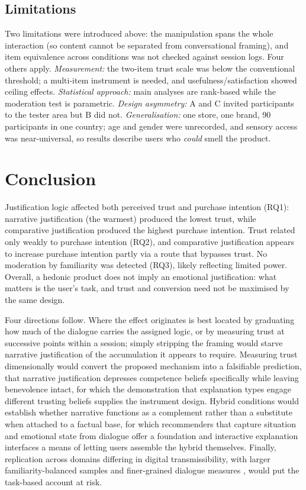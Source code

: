 \documentclass[conference]{IEEEtran}
\begin{document}
\subsection{Limitations}

Two limitations were introduced above: the manipulation spans the whole interaction (so
content cannot be separated from conversational framing), and item equivalence across
conditions was not checked against session logs. Four others apply.
\textit{Measurement:} the two-item trust scale was below the conventional threshold; a
multi-item instrument is needed, and usefulness/satisfaction showed ceiling effects.
\textit{Statistical approach:} main analyses are rank-based while the moderation test is
parametric. \textit{Design asymmetry:} A and C invited participants to the tester area but B
did not. \textit{Generalisation:} one store, one brand, 90 participants in one country; age
and gender were unrecorded, and sensory access was near-universal, so results describe users
who \textit{could} smell the product.

\section{Conclusion}
\label{sec:conclusion}

Justification logic affected both perceived trust and purchase intention (RQ1): narrative
justification (the warmest) produced the lowest trust, while comparative justification
produced the highest purchase intention. Trust related only weakly to purchase intention
(RQ2), and comparative justification appears to increase purchase intention partly via a
route that bypasses trust. No moderation by familiarity was detected (RQ3), likely reflecting
limited power. Overall, a hedonic product does not imply an emotional justification: what
matters is the user's task, and trust and conversion need not be maximised by the same
design.

Four directions follow. Where the effect originates is best located by graduating how much
of the dialogue carries the assigned logic, or by measuring trust at successive points
within a session; simply stripping the framing would starve narrative justification of the
accumulation it appears to require. Measuring trust dimensionally would convert the proposed mechanism into a falsifiable prediction, that
narrative justification depresses competence beliefs specifically while leaving benevolence
intact, for which the demonstration that explanation types engage different trusting beliefs
\cite{wang2007} supplies the instrument design. Hybrid conditions would establish whether
narrative functions as a complement rather than a substitute when attached to a factual
base, for which recommenders that capture situation and emotional state from dialogue
\cite{yang2025} offer a foundation and interactive explanation interfaces
\cite{ziegler2023} a means of letting users assemble the hybrid themselves. Finally,
replication across domains differing in digital transmissibility, with larger
familiarity-balanced samples and finer-grained dialogue measures \cite{siro2023}, would put
the task-based account at risk.
\end{document}
